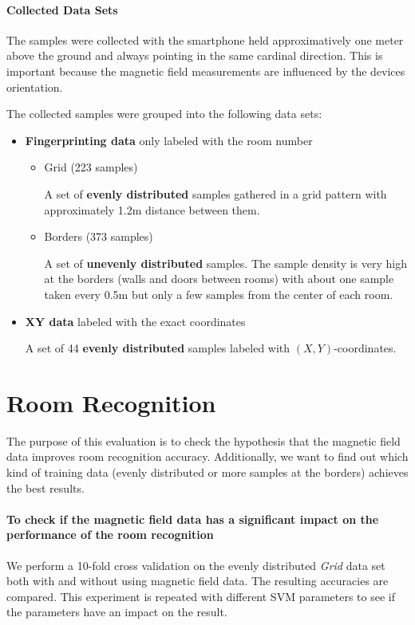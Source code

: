 \paragraph{Collected Data Sets} The samples were collected with the smartphone held approximatively one meter above the ground and always pointing in the same cardinal direction. This is important because the magnetic field measurements are influenced by the devices orientation.

The collected samples were grouped into the following data sets:

\begin{itemize}
\item \textbf{Fingerprinting data} only labeled with the room number
	\begin{itemize}
	\item Grid (223 samples)

	A set of \textbf{evenly distributed} samples gathered in a grid pattern with approximately 1.2m distance between them.
	\item Borders (373 samples)

	A set of \textbf{unevenly distributed} samples. The sample density is very high at the borders (walls and doors between rooms) with about one sample taken every 0.5m but only a few samples from the center of each room.
	\end{itemize}
 \item \textbf{XY data} labeled with the exact coordinates

 A set of 44 \textbf{evenly distributed} samples labeled with \((X,Y)\)-coordinates.
\end{itemize}

\section{Room Recognition}
\label{EvaluationRoomRecognition}

The purpose of this evaluation is to check the hypothesis that the magnetic field data improves room recognition accuracy. Additionally, we want to find out which kind of training data (evenly distributed or more samples at the borders) achieves the best results.

\paragraph{To check if the magnetic field data has a significant impact on the performance of the room recognition} We perform a 10-fold cross validation\cite{crossvalidation} on the evenly distributed \emph{Grid} data set both with and without using magnetic field data. The resulting accuracies are compared. This experiment is repeated with different SVM parameters to see if the parameters have an impact on the result.

